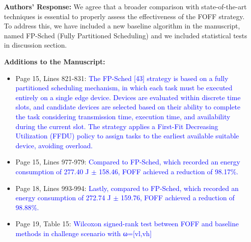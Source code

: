 \textbf{Authors' Response:}
We agree that a broader comparison with state-of-the-art techniques is essential to properly assess the effectiveness of the FOFF strategy. To address this, we have included a new baseline algorithm in the manuscript, named FP-Sched (Fully Partitioned Scheduling) and we included statistical tests in discussion section.
\vspace{\baselineskip}

\textbf{Additions to the Manuscript:} 

\begin{itemize}
    \item Page 15, Lines 821-831: \textcolor{blue}{The FP-Sched [43] strategy is based on a fully partitioned scheduling mechanism, in which each task must be executed entirely on a single edge device. Devices are evaluated within discrete time slots, and candidate devices are selected based on their ability to complete the task considering transmission time, execution time, and availability during the current slot. The strategy applies a First-Fit Decreasing Utilization (FFDU) policy to assign tasks to the earliest available suitable device, avoiding overload.}
    \item Page 15, Lines 977-979: \textcolor{blue}{Compared to FP-Sched, which recorded an energy consumption of 277.40 J $\pm$ 158.46, FOFF achieved a reduction of 98.17\%.}
    \item Page 18, Lines 993-994: \textcolor{blue}{Lastly, compared to FP-Sched, which recorded an energy consumption of 272.74 J $\pm$ 159.76, FOFF achieved a reduction of 98.88\%.}
    \item Page 19, Table 15: \textcolor{blue}{Wilcoxon signed-rank test between FOFF and baseline methods in challenge scenario with ω=[vl,vh]}

\end{itemize}
